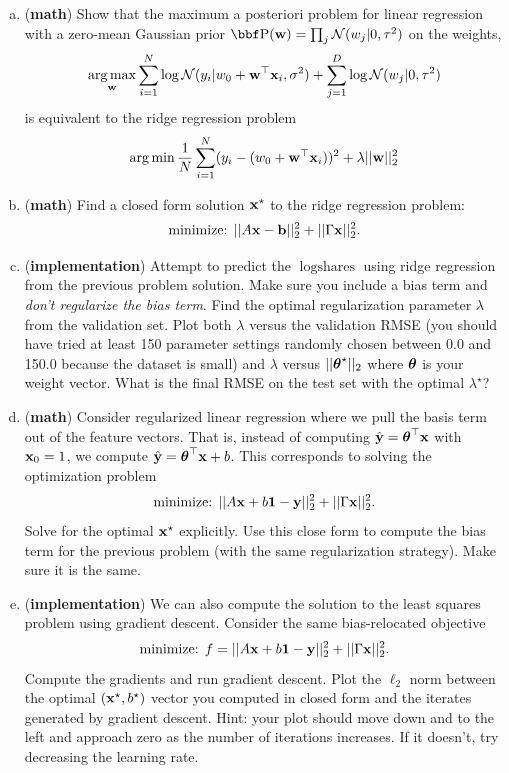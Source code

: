 \documentclass[12pt,letterpaper,fleqn]{hmcpset}
\begin{document}
\begin{enumerate}[(a)]
    \item (\textbf{math}) Show that the maximum a posteriori problem for
        linear regression with a zero-mean Gaussian prior $\PP(\ww) = \prod_j
        \Nc(w_j | 0, \tau^2)$ on the weights,
        \[
            \operatorname*{arg\,max}_{\bf w} \sum_{i=1}^N \log{\cal N}(y_i | w_0 + {\bf w}^\top{\bf x}_i, \sigma^2) + \sum_{j=1}^D \log{\cal N}(w_j | 0, \tau^2)
        \]
        is equivalent to the ridge regression problem
        \[
            \operatorname*{arg\,min} \frac{1}{N}\sum_{i=1}^N (y_i - (w_0 + {\bf w}^\top{\bf x}_i))^2 + \lambda ||{\bf w}||_2^2
        \]
    \item (\textbf{math}) Find a closed form solution ${\bf x}^\star$ to the ridge regression
        problem:
        \[
            \text{minimize: } ||A{\bf x} - {\bf b}||_2^2 + ||\Gamma{\bf x}||_2^2.
        \]
    \item (\textbf{implementation}) Attempt to predict the $\log\text{shares}$ using ridge
        regression from the previous problem solution. Make sure you include a bias
        term and \textit{don't regularize the bias term}.
        Find the optimal regularization parameter $\lambda$
        from the validation set. Plot both $\lambda$ versus the validation RMSE (you should have
        tried at least 150 parameter settings randomly chosen between 0.0 and 150.0 because
        the dataset is small)
        and $\lambda$ versus $||\hbox{\boldmath$\theta$}^\star||_2$ where $\hbox{\boldmath$\theta$}$ is your weight vector.
        What is the final RMSE on the test set with the optimal $\lambda^\star$?
    \item (\textbf{math}) Consider regularized linear regression where we pull the
        basis term out of the feature vectors. That is, instead of computing $\hat{{\bf y}}
        = \hbox{\boldmath$\theta$}^\top{\bf x}$ with ${\bf x}_0 = 1$, we compute $\hat{{\bf y}} = \hbox{\boldmath$\theta$}^\top{\bf x} + b$.
        This corresponds to solving the optimization problem
        \[
            \text{minimize: } ||A{\bf x} + b{\bf 1} - {\bf y}||_2^2 + ||\Gamma{\bf x}||_2^2.
        \]
        Solve for the optimal ${\bf x}^\star$ explicitly. Use this close form to compute the
        bias term for the previous problem (with the same regularization strategy). Make
        sure it is the same.
    \item (\textbf{implementation}) We can also compute the solution to the least squares
        problem using gradient descent. Consider the same bias-relocated objective
        \[
            \text{minimize: } f = ||A{\bf x} + b{\bf 1} - {\bf y}||_2^2 + ||\Gamma{\bf x}||_2^2.
        \]
        Compute the gradients and run gradient descent. Plot the $\ell_2$ norm
        between the optimal $({\bf x}^\star, b^\star)$ vector you computed in closed form
        and the iterates generated by gradient descent. Hint: your plot should move
        down and to the left and approach zero as the number of iterations increases. If
        it doesn't, try decreasing the learning rate.
\end{enumerate}
\end{document}
